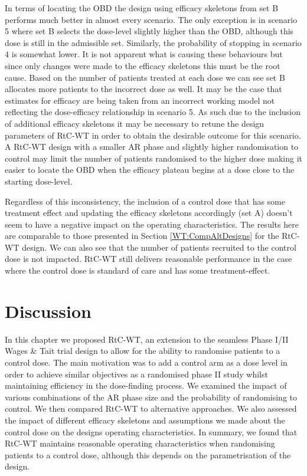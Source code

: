 In terms of locating the OBD the design using efficacy skeletons from set B performs much better in almost every scenario. The only exception is in scenario 5 where set B selects the dose-level slightly higher than the OBD, although this dose is still in the admissible set. Similarly, the probability of stopping in scenario 4 is somewhat lower. It is not apparent what is causing these behaviours but since only changes were made to the efficacy skeletons this must be the root cause. Based on the number of patients treated at each dose we can see set B allocates more patients to the incorrect dose as well. It may be the case that estimates for efficacy are being taken from an incorrect working model not reflecting the dose-efficacy relationship in scenario 5. As such due to the inclusion of additional efficacy skeletons it may be necessary to retune the design parameters of RtC-WT in order to obtain the desirable outcome for this scenario. A RtC-WT design with a smaller AR phase and slightly higher randomisation to control may limit the number of patients randomised to the higher dose making it easier to locate the OBD when the efficacy plateau begins at a dose close to the starting dose-level.   

Regardless of this inconsistency, the inclusion of a control dose that has some treatment effect and updating the efficacy skeletons accordingly (set A) doesn't seem to have a negative impact on the operating characteristics. The results here are comparable to those presented in Section \ref{WT:CompAltDesigns} for the RtC-WT design. We can also see that the number of patients recruited to the control dose is not impacted. RtC-WT still delivers reasonable performance in the case where the control dose is standard of care and has some treatment-effect. 


 \section{Discussion}
 \label{WT:Discussion}

In this chapter we proposed RtC-WT, an extension to the seamless Phase \RN{1}/\RN{2} Wages \& Tait trial design to allow for the ability to randomise patients to a control dose. The main motivation was to add a control arm as a dose level in order to achieve similar objectives as a randomised phase \RN{2} study whilst maintaining efficiency in the dose-finding process. We examined the impact of various combinations of the AR phase size and the probability of randomising to control. We then compared RtC-WT to alternative approaches. We also assessed the impact of different efficacy skeletons and assumptions we made about the control dose on the designs operating characteristics. In summary, we found that RtC-WT maintains reasonable operating characteristics when randomising patients to a control dose, although this depends on the parametrisation of the design.   

